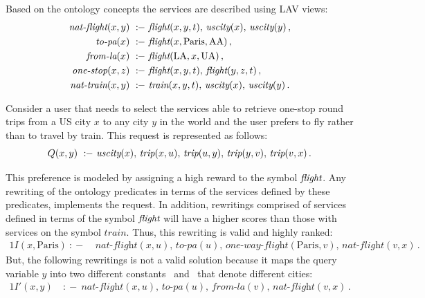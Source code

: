 \documentclass{llncs}
\newcommand{\qrule}{:\!\!-}
\newcommand{\flight}{\text{\it flight}}
\newcommand{\UScity}{\text{\it uscity}}
\newcommand{\trip}{\textit{trip}}
\newcommand{\train}{\textit{train}}
\renewcommand{\AA}{\text{AA}}
\newcommand{\UA}{\text{UA}}
\newcommand{\PA}{\text{Paris}}
\newcommand{\LA}{\text{LA}}
\newcommand{\nationaltlight}{\textit{nat-flight}}
\newcommand{\onewayflight}{\textit{one-way-flight}}
\newcommand{\nationaltrain}{\textit{nat-train}}
\newcommand{\onestop}{\textit{one-stop}}
\newcommand{\toPA}{\textit{to-pa}}
\newcommand{\fromLA}{\textit{from-la}}
\begin{document}
Based on the ontology concepts the services are described using LAV views:
\begin{alignat*}{1}
\nationaltlight(x,y)\ &\qrule\ \flight(x,y,t),\,\UScity(x),\,\UScity(y)\,, \\
\toPA(x)\             &\qrule\ \flight(x,\PA,\AA)\,, \\
\fromLA(x)\           &\qrule\ \flight(\LA,x,\UA)\,, \\
\onestop(x,z)\          &\qrule\ \flight(x,y,t),\,\flight(y,z,t)\,, \\
\nationaltrain(x,y)\  &\qrule\ \train(x,y,t),\,\UScity(x),\,\UScity(y)\,. 
\end{alignat*}

Consider a user that needs to select the services able to
retrieve one-stop round trips from a US city $x$ to any city $y$ in the world and the user prefers to fly rather than to travel by train. This request is represented as follows:
\[ Q(x,y)\ \qrule\ \UScity(x),\,\trip(x,u),\,\trip(u,y),\,\trip(y,v),\,\trip(v,x)\,. \]

 This preference is modeled by assigning a high reward to the symbol $\flight$. Any rewriting of the ontology predicates in terms of the services defined by these predicates, implements the request.
In addition, rewritings comprised of services defined in terms of the symbol $\flight$ will have a higher scores than those with services on the symbol $\train$.
Thus, this rewriting is  valid and  highly ranked:
\begin{alignat*}{1}
I(x,\PA)\ \qrule\ &\nationaltlight(x,u),\,\toPA(u),\, \onewayflight(\PA,v),\,\nationaltlight(v,x)\,. 
\end{alignat*}
But, the following rewritings is not a valid solution because it maps the query variable $y$ into two different constants \PA\ and \LA\ that denote different cities:
\begin{alignat*}{1}
 I'(x,y)\  &\qrule\ \nationaltlight(x,u),\,\toPA(u),\,\fromLA(v),\,\nationaltlight(v,x)\,.
\end{alignat*}
\end{document}

